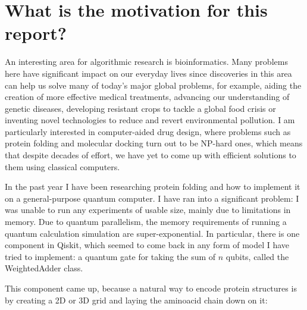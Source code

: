 \section{What is the motivation for this report?}

An interesting area for algorithmic research is bioinformatics. Many problems here have significant impact on our everyday lives since discoveries in this area can help us solve many of today’s major global problems, for example, aiding the creation of more effective medical treatments, advancing our understanding of genetic diseases, developing resistant crops to tackle a global food crisis or inventing novel technologies to reduce and revert environmental pollution. I am particularly interested in computer-aided drug design, where problems such as protein folding and molecular docking turn out to be NP-hard ones, which means that despite decades of effort, we have yet to come up with efficient solutions to them using classical computers.

In the past year I have been researching protein folding and how to implement it on a general-purpose quantum computer. I have ran into a significant problem: I was unable to run any experiments of usable size, mainly due to limitations in memory. Due to quantum parallelism, the memory requirements of running a quantum calculation simulation are super-exponential. In particular, there is one component in Qiskit, which seemed to come back in any form of model I have tried to implement: a quantum gate for taking the sum of $n$ qubits, called the WeightedAdder class. 

This component came up, because a natural way to encode protein structures is by creating a 2D or 3D grid and laying the aminoacid chain down on it:

